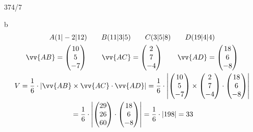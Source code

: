 \begin{exercise}{374/7}
  \item [b]
  \begin{gather*}
    A(1|-2|12) \qquad B(11|3|5) \qquad C(3|5|8) \qquad D(19|4|4) \\
    \vv{AB} = \begin{pmatrix}10 \\ 5 \\ -7\end{pmatrix} \qquad \vv{AC} = \begin{pmatrix}2 \\ 7 \\ -4\end{pmatrix} \qquad \vv{AD} = \begin{pmatrix}18 \\ 6 \\ -8\end{pmatrix} \\
    V = \frac{1}{6} \cdot |\vv{AB} \times \vv{AC} \cdot \vv{AD}| = \frac{1}{6} \cdot \left|\begin{pmatrix}10 \\ 5 \\ -7\end{pmatrix} \times \begin{pmatrix}2 \\ 7 \\ -4\end{pmatrix} \cdot \begin{pmatrix}18 \\ 6 \\ -8\end{pmatrix}\right| \\
    \;= \frac{1}{6} \cdot \left|\begin{pmatrix}29 \\ 26 \\ 60\end{pmatrix} \cdot \begin{pmatrix}18 \\ 6 \\ -8\end{pmatrix}\right| = \frac{1}{6} \cdot |198| = 33
  \end{gather*}
\end{exercise}
